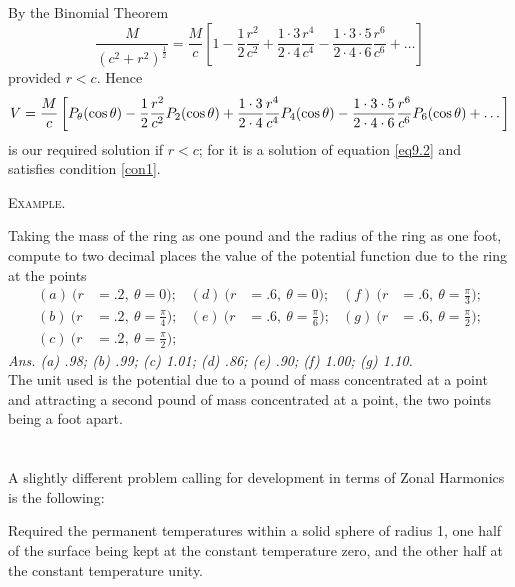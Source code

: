 \documentclass[oneside,12pt]{book}
\begin{document}
By the Binomial Theorem 
\begin{equation*}
    \frac{M}{(c^2+r^2)^{\frac{1}{2}}}=\frac{M}{c}\left[1-\frac{1}{2}\frac{r^2}{c^2}+\frac{1\cdot3}{2\cdot4}\frac{r^4}{c^4}-\frac{1\cdot3\cdot5}{2\cdot4\cdot6}\frac{r^6}{c^6}+\dots\right]
\end{equation*}
provided $r<c$. Hence 
\begin{multline}
    V=\frac{M}{c}\left[P_\theta(\cos\theta)-\frac{1}{2}\frac{r^2}{c^2}P_2(\cos\theta)+\frac{1\cdot3}{2\cdot4}\frac{r^4}{c^4}P_4\linebreak(\cos\theta)-\frac{1\cdot3\cdot5}{2\cdot4\cdot6}\frac{r^6}{c^6}P_6(\cos\theta)+\dots\right]
    \label{eq9.12}
\end{multline}
is our required solution if $r<c$; for it is a solution of equation \eqref{eq9.2} and satisfies condition \eqref{con1}. \par 

\begin{center}
    \textsc{Example.}
\end{center}
Taking the mass of the ring as one pound and the radius of the ring as one foot, compute to two decimal places the value of the potential function due to the ring at the points 
\begin{align*}
    (a)\ (r&=.2,\ \theta=0); & (d)\ (r&=.6,\ \theta=0); & (f)\ (r&=.6,\ \theta=\frac{\pi}{3}); \\ 
    (b)\ (r&=.2,\ \theta=\frac{\pi}{4}); & (e)\ (r&=.6,\ \theta=\frac{\pi}{6}); & (g)\ (r&=.6,\ \theta=\frac{\pi}{2}); \\
    (c)\ (r&=.2,\ \theta=\frac{\pi}{2}); 
\end{align*} \textit{Ans. (a) \emph{.98}; (b) \emph{.99}; (c) \emph{1.01}; (d) \emph{.86}; (e) \emph{.90}; (f) \emph{1.00}; (g) \emph{1.10}.} \\  
The unit used is the potential due to a pound of mass concentrated at a point and attracting a second pound of mass concentrated at a point, the two points being a foot apart. \par 

\section{} A slightly different problem calling for development in terms of Zonal Harmonics is the following: \par 

Required the permanent temperatures within a solid sphere of radius 1, one half of the surface being kept at the constant temperature zero, and the other half at the constant temperature unity. \par 
\end{document}

